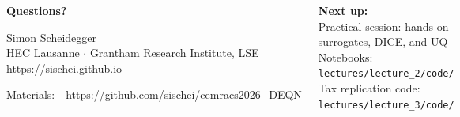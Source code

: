 \documentclass[aspectratio=169,11pt]{beamer}
\begin{document}
\begin{frame}{}
\begin{columns}[c]
\begin{center}
{\Huge \textcolor{uzhblue}{\textbf{Questions?}}}

\vspace{1.0cm}
{\large Simon Scheidegger}\\[4pt]
{\small HEC Lausanne $\cdot$ Grantham Research Institute, LSE}\\[4pt]
\url{https://sischei.github.io}

\vspace{0.6cm}
{\small Materials:~~\url{https://github.com/sischei/cemracs2026_DEQN}}
\end{center}

\begin{center}
\textbf{Next up:}\\[6pt]
{\large Practical session: hands-on\\[2pt]
surrogates, DICE, and UQ}\\[12pt]
{\small Notebooks: \texttt{lectures/lecture\_2/code/}\\[2pt]
Tax replication code: \texttt{lectures/lecture\_3/code/}}
\end{center}
\end{columns}
\end{frame}


\appendix
\end{document}
